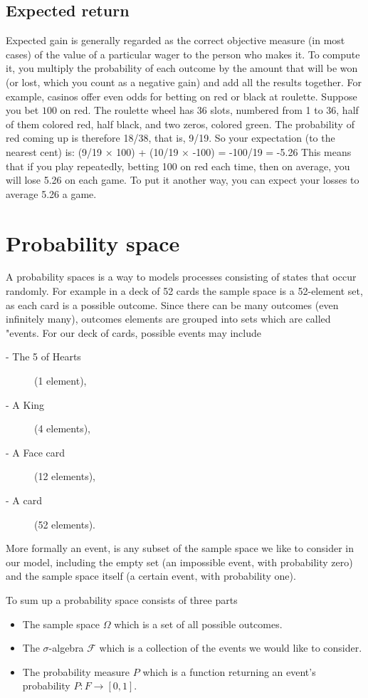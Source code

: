 \subsection{Expected return}
Expected gain is generally regarded as the correct objective measure (in most cases) of the value of a particular wager to the person who makes it. To compute it, you multiply the probability of each outcome by the amount that will be won (or lost, which you count as a negative gain) and add all the results together. For example, casinos offer even odds for betting on red or black at roulette. Suppose you bet $100$ on red. The roulette wheel has 36 slots, numbered from 1 to 36, half of them colored red, half black, and two zeros, colored green. The probability of red coming up is therefore 18/38, that is, 9/19. So your expectation (to the nearest cent) is: (9/19 × 100) + (10/19 × -100) = -100/19 = -5.26 This means that if you play repeatedly, betting 100 on red each time, then on average, you will lose 5.26 on each game. To put it another way, you can expect your losses to average 5.26 a game.

\section{Probability space}
A probability spaces is a way to models processes consisting of states that occur randomly. For example in a deck of 52 cards the sample space is a 52-element set, as each card is a possible outcome. Since there can be many outcomes (even infinitely many), outcomes elements are grouped into sets which are called "events. For our deck of cards, possible events may include
\begin{description}
\item [- The 5 of Hearts] (1 element),
\item [- A King] (4 elements),
\item [- A Face card] (12 elements),
\item [- A card] (52 elements).
\end{description}
More formally an event, is any subset of the sample space we like to consider in our model, including the empty set (an impossible event, with probability zero) and the sample space itself (a certain event, with probability one).

\noindent To sum up a probability space consists of three parts
\begin{itemize}
\item The sample space $\Omega$ which is a set of all possible outcomes.
\item The $\sigma$-algebra $\mathcal{F}$ which is a collection of the events we would like to consider.
\item The probability measure $P$ which is a function returning an event's probability $P: F \rightarrow [0,1]$.
\end{itemize}

